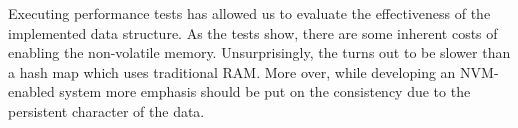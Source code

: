     Executing performance tests has allowed us to evaluate the effectiveness of the implemented data structure. 
    As the tests show, there are some inherent costs of enabling the non-volatile memory. 
    Unsurprisingly, the \NvmHashMap turns out to be slower than a hash map which uses traditional RAM. 
    More over, while developing an NVM-enabled system more emphasis should be put on the consistency due to the persistent character of the data.